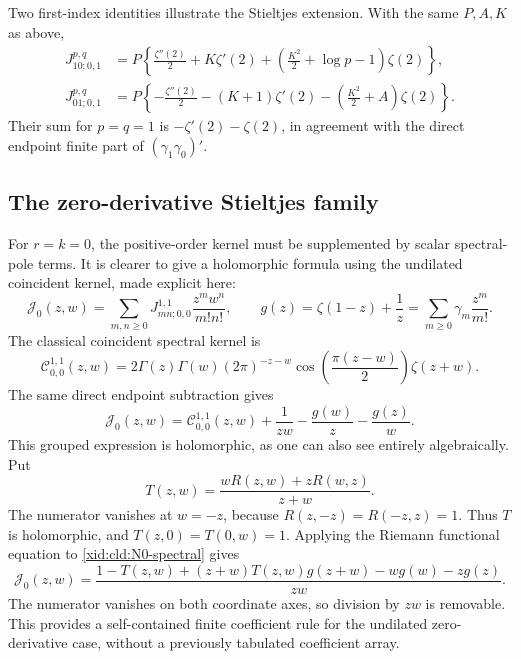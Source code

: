 Two first-index identities illustrate the Stieltjes extension.  With
the same $P,A,K$ as above,
\begin{align}
 J_{10;0,1}^{p,q}
 &=P\left\{\frac{\zeta''(2)}2+K\zeta'(2)
            +\left(\frac{K^2}2+\log p-1\right)\zeta(2)\right\},\\
 J_{01;0,1}^{p,q}
 &=P\left\{-\frac{\zeta''(2)}2-(K+1)\zeta'(2)
            -\left(\frac{K^2}2+A\right)\zeta(2)\right\}.
 \label{xid:cld:first-jets}
\end{align}
Their sum for $p=q=1$ is $-\zeta'(2)-\zeta(2)$, in agreement with
the direct endpoint finite part of $(\gamma_1\gamma_0)'$.

\subsection{The zero-derivative Stieltjes family}

For $r=k=0$, the positive-order kernel must be supplemented by scalar
spectral-pole terms.  It is clearer to give a holomorphic formula using
the undilated coincident kernel, made explicit here:
\[
 \mathscr J_0(z,w)=\sum_{m,n\ge0}J_{mn;0,0}^{1,1}
                         \frac{z^mw^n}{m!n!},
 \qquad g(z)=\zeta(1-z)+\frac1z
          =\sum_{m\ge0}\gamma_m\frac{z^m}{m!}.
\]
The classical coincident spectral kernel is
\begin{equation}
 \mathscr C_{0,0}^{1,1}(z,w)
 =2\Gamma(z)\Gamma(w)(2\pi)^{-z-w}
       \cos\!\left(\frac{\pi(z-w)}2\right)\zeta(z+w).
 \label{xid:cld:N0-spectral}
\end{equation}
The same direct endpoint subtraction gives
\begin{equation}
 \mathscr J_0(z,w)=\mathscr C_{0,0}^{1,1}(z,w)+\frac1{zw}
                             -\frac{g(w)}z-\frac{g(z)}w.
 \label{xid:cld:J0-explicit}
\end{equation}
This grouped expression is holomorphic, as one can also see entirely
algebraically.  Put
\[
 T(z,w)=\frac{wR(z,w)+zR(w,z)}{z+w}.
\]
The numerator vanishes at $w=-z$, because $R(z,-z)=R(-z,z)=1$.
Thus $T$ is holomorphic, and $T(z,0)=T(0,w)=1$.  Applying the Riemann
functional equation to \eqref{xid:cld:N0-spectral} gives
\begin{equation}
 \mathscr J_0(z,w)=
 \frac{1-T(z,w)+(z+w)T(z,w)g(z+w)-wg(w)-zg(z)}{zw}.
 \label{xid:cld:J0-removable}
\end{equation}
The numerator vanishes on both coordinate axes, so division by $zw$
is removable.  This provides a self-contained finite coefficient rule
for the undilated zero-derivative case, without a previously tabulated
coefficient array.

